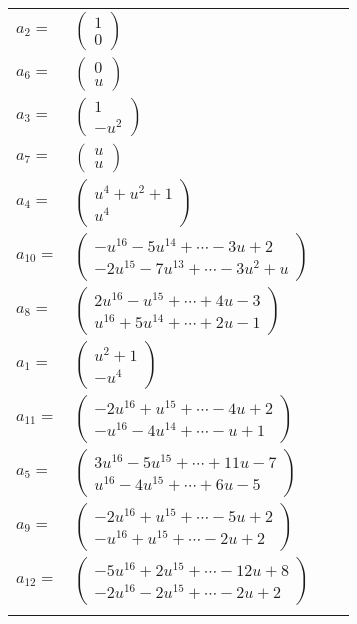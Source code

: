 \documentclass[1p]{elsarticle_modified}
\theoremstyle{definition}
\begin{document}
\begin{tabular}{m{7pt} m{180pt} m{7pt} m{180pt} }
\flushright $a_{2}=$&$\begin{pmatrix}1\\0\end{pmatrix}$ \\
\flushright $a_{6}=$&$\begin{pmatrix}0\\u\end{pmatrix}$ \\
\flushright $a_{3}=$&$\begin{pmatrix}1\\- u^2\end{pmatrix}$ \\
\flushright $a_{7}=$&$\begin{pmatrix}u\\u\end{pmatrix}$ \\
\flushright $a_{4}=$&$\begin{pmatrix}u^4+u^2+1\\u^4\end{pmatrix}$ \\
\flushright $a_{10}=$&$\begin{pmatrix}- u^{16}-5 u^{14}+\cdots-3 u+2\\-2 u^{15}-7 u^{13}+\cdots-3 u^2+u\end{pmatrix}$ \\
\flushright $a_{8}=$&$\begin{pmatrix}2 u^{16}- u^{15}+\cdots+4 u-3\\u^{16}+5 u^{14}+\cdots+2 u-1\end{pmatrix}$ \\
\flushright $a_{1}=$&$\begin{pmatrix}u^2+1\\- u^4\end{pmatrix}$ \\
\flushright $a_{11}=$&$\begin{pmatrix}-2 u^{16}+u^{15}+\cdots-4 u+2\\- u^{16}-4 u^{14}+\cdots- u+1\end{pmatrix}$ \\
\flushright $a_{5}=$&$\begin{pmatrix}3 u^{16}-5 u^{15}+\cdots+11 u-7\\u^{16}-4 u^{15}+\cdots+6 u-5\end{pmatrix}$ \\
\flushright $a_{9}=$&$\begin{pmatrix}-2 u^{16}+u^{15}+\cdots-5 u+2\\- u^{16}+u^{15}+\cdots-2 u+2\end{pmatrix}$ \\
\flushright $a_{12}=$&$\begin{pmatrix}-5 u^{16}+2 u^{15}+\cdots-12 u+8\\-2 u^{16}-2 u^{15}+\cdots-2 u+2\end{pmatrix}$\\&\end{tabular}
\end{document}
